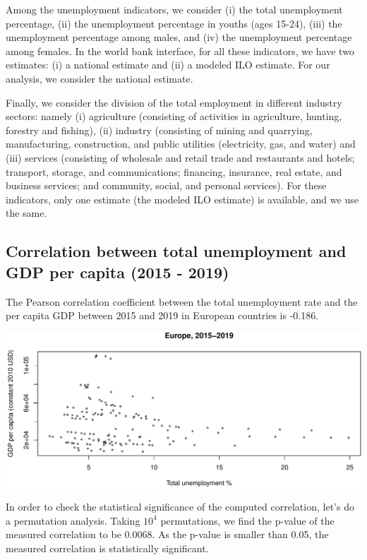 \documentclass[
]{article}
\begin{document}
Among the unemployment indicators, we consider (i) the total
unemployment percentage, (ii) the unemployment percentage in youths
(ages 15-24), (iii) the unemployment percentage among males, and (iv)
the unemployment percentage among females. In the world bank interface,
for all these indicators, we have two estimates: (i) a national estimate
and (ii) a modeled ILO estimate. For our analysis, we consider the
national estimate.

Finally, we consider the division of the total employment in different
industry sectors: namely (i) agriculture (consisting of activities in
agriculture, hunting, forestry and fishing), (ii) industry (consisting
of mining and quarrying, manufacturing, construction, and public
utilities (electricity, gas, and water) and (iii) services (consisting
of wholesale and retail trade and restaurants and hotels; transport,
storage, and communications; financing, insurance, real estate, and
business services; and community, social, and personal services). For
these indicators, only one estimate (the modeled ILO estimate) is
available, and we use the same.

\hypertarget{correlation-between-total-unemployment-and-gdp-per-capita-2015---2019}{%
\subsection{Correlation between total unemployment and GDP per capita
(2015 -
2019)}\label{correlation-between-total-unemployment-and-gdp-per-capita-2015---2019}}

The Pearson correlation coefficient between the total unemployment rate
and the per capita GDP between 2015 and 2019 in European countries is
-0.186.

\includegraphics{main_files/figure-latex/unnamed-chunk-7-1.pdf}

In order to check the statistical significance of the computed
correlation, let's do a permutation analysis. Taking \ensuremath{10^{4}}
permutations, we find the p-value of the measured correlation to be
0.0068. As the p-value is smaller than 0.05, the measured correlation is
statistically significant.
\end{document}
